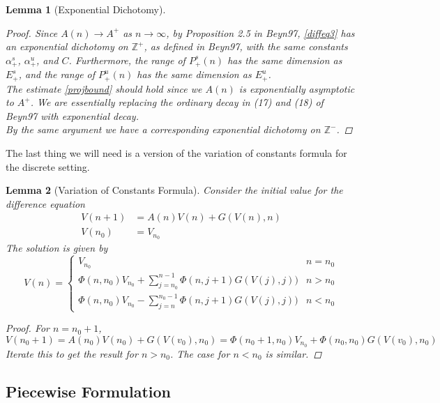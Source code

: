 \documentclass[12pt]{article}
\def\Z{{\mathbb Z}}
\newtheorem{lemma}{Lemma}
\begin{document}
\begin{lemma}[Exponential Dichotomy]
\begin{proof}
Since $A(n) \rightarrow A^+$ as $n \rightarrow \infty$, by Proposition 2.5 in Beyn97, \eqref{diffeq3} has an exponential dichotomy on $\Z^+$, as defined in Beyn97, with the same constants $\alpha_+^s$, $\alpha_+^u$, and $C$. Furthermore, the range of $P_+^s(n)$ has the same dimension as $E_+^s$, and the range of $P_+^u(n)$ has the same dimension as $E_+^u$. \\

The estimate \eqref{projbound} should hold since we $A(n)$ is exponentially asymptotic to $A^+$. We are essentially replacing the ordinary decay in (17) and (18) of Beyn97 with exponential decay.\\

By the same argument we have a corresponding exponential dichotomy on $\Z^-$.

\end{proof}
\end{lemma}

The last thing we will need is a version of the variation of constants formula for the discrete setting.

\begin{lemma}[Variation of Constants Formula]\label{VOC}
Consider the initial value for the difference equation
\begin{align*}
V(n+1) &= A(n) V(n) + G(V(n), n) \\
V(n_0) &= V_{n_0}
\end{align*}
The solution is given by
\begin{equation}\label{VOCformula}
V(n) = 
\begin{cases}
V_{n_0} & n = n_0 \\
\Phi(n, n_0) V_{n_0} + \sum_{j = n_0}^{n-1} \Phi(n, j+1) G(V(j), j)) & n > n_0 \\
\Phi(n, n_0) V_{n_0} - \sum_{j = n}^{n_0-1} \Phi(n, j+1) G(V(j), j)) & n < n_0 

\end{cases}
\end{equation}

\begin{proof}
For $n = n_0 + 1$,
\[
V(n_0 + 1) = A(n_0) V(n_0) + G(V(v_0), n_0) = \Phi(n_0+1, n_0) V_{n_0} + \Phi(n_0, n_0) G(V(v_0), n_0)
\]
Iterate this to get the result for $n > n_0$. The case for $n < n_0$ is similar.
\end{proof}
\end{lemma}

\subsection{Piecewise Formulation}
\end{document}
